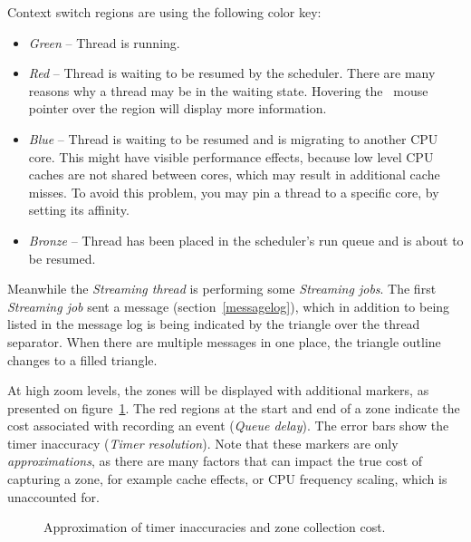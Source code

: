 \documentclass[hidelinks,titlepage,a4paper]{article}
\begin{document}
Context switch regions are using the following color key:

\begin{itemize}
\item \emph{Green} -- Thread is running.
\item \emph{Red} -- Thread is waiting to be resumed by the scheduler. There are many reasons why a thread may be in the waiting state. Hovering the \faMousePointer{}~mouse pointer over the region will display more information.
\item \emph{Blue} -- Thread is waiting to be resumed and is migrating to another CPU core. This might have visible performance effects, because low level CPU caches are not shared between cores, which may result in additional cache misses. To avoid this problem, you may pin a thread to a specific core, by setting its affinity.
\item \emph{Bronze} -- Thread has been placed in the scheduler's run queue and is about to be resumed.
\end{itemize}

Meanwhile the \emph{Streaming thread} is performing some \emph{Streaming jobs}. The first \emph{Streaming job} sent a message (section~\ref{messagelog}), which in addition to being listed in the message log is being indicated by the triangle over the thread separator. When there are multiple messages in one place, the triangle outline changes to a filled triangle.

At high zoom levels, the zones will be displayed with additional markers, as presented on figure~\ref{inaccuracy}. The red regions at the start and end of a zone indicate the cost associated with recording an event (\emph{Queue delay}). The error bars show the timer inaccuracy (\emph{Timer resolution}). Note that these markers are only \emph{approximations}, as there are many factors that can impact the true cost of capturing a zone, for example cache effects, or CPU frequency scaling, which is unaccounted for.

\begin{figure}[h]
\centering{}
\caption{Approximation of timer inaccuracies and zone collection cost.}
\label{inaccuracy}
\end{figure}
\end{document}
